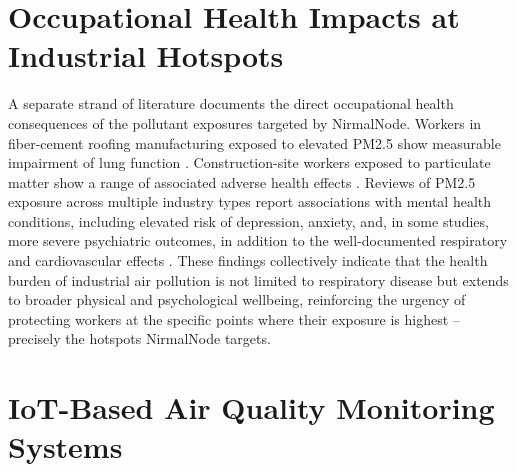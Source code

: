 \section{Occupational Health Impacts at Industrial Hotspots}
\label{sec:lr-occupational-health}

A separate strand of literature documents the direct occupational health consequences of the pollutant exposures targeted by NirmalNode. Workers in fiber-cement roofing manufacturing exposed to elevated PM2.5 show measurable impairment of lung function \citep{nasri2023pm25}. Construction-site workers exposed to particulate matter show a range of associated adverse health effects \citep{sekhavati2023particulate}. Reviews of PM2.5 exposure across multiple industry types report associations with mental health conditions, including elevated risk of depression, anxiety, and, in some studies, more severe psychiatric outcomes, in addition to the well-documented respiratory and cardiovascular effects \citep{alhadhrami2024pm25mental}. These findings collectively indicate that the health burden of industrial air pollution is not limited to respiratory disease but extends to broader physical and psychological wellbeing, reinforcing the urgency of protecting workers at the specific points where their exposure is highest -- precisely the hotspots NirmalNode targets.

\section{IoT-Based Air Quality Monitoring Systems}
\label{sec:lr-iot-monitoring}

